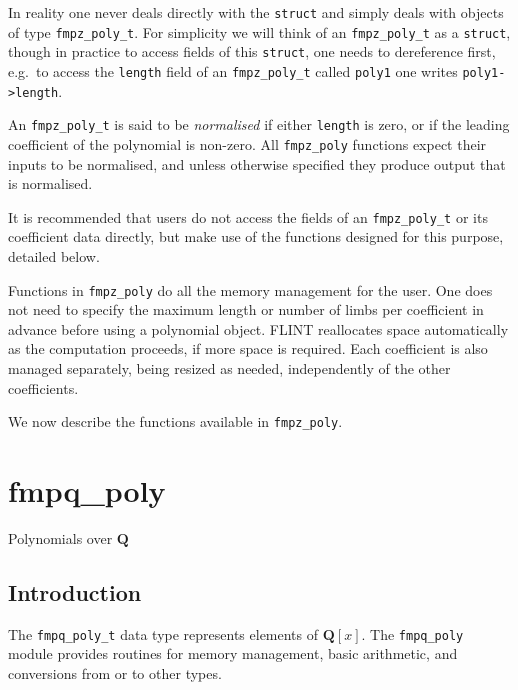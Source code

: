 \documentclass[a4paper,10pt]{book}
\newcommand{\Q}{\mathbf{Q}}%
\newcommand{\code}{\lstinline}
\begin{document}
In reality one never deals directly with the \code{struct} and simply deals 
with objects of type \code{fmpz_poly_t}.  For simplicity we will think of an 
\code{fmpz_poly_t} as a \code{struct}, though in practice to access fields 
of this \code{struct}, one needs to dereference first, e.g.\ to access the 
\code{length} field of an \code{fmpz_poly_t} called \code{poly1} one writes 
\code{poly1->length}. 

An \code{fmpz_poly_t} is said to be \emph{normalised} if either 
\code{length} is zero, or if the leading coefficient of the polynomial is 
non-zero.  All \code{fmpz_poly} functions expect their inputs to be 
normalised, and unless otherwise specified they produce output that is 
normalised. 

It is recommended that users do not access the fields of an 
\code{fmpz_poly_t} or its coefficient data directly, but make use of the 
functions designed for this purpose, detailed below.

Functions in \code{fmpz_poly} do all the memory management for the user. 
One does not need to specify the maximum length or number of limbs per 
coefficient in advance before using a polynomial object.  FLINT reallocates 
space automatically as the computation proceeds, if more space is required. 
Each coefficient is also managed separately, being resized as needed, 
independently of the other coefficients.

We now describe the functions available in \code{fmpz_poly}.




\chapter{fmpq\_poly}
\epigraph{Polynomials over $\Q$}{}

\section{Introduction}

The \code{fmpq_poly_t} data type represents elements of $\Q[x]$. The 
\code{fmpq_poly} module provides routines for memory management, basic 
arithmetic, and conversions from or to other types.
\end{document}
